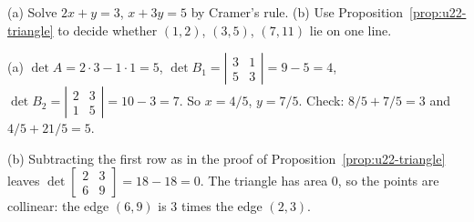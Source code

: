 \begin{exercise}\label{exr:u22-small}
(a) Solve $2x+y=3$, $x+3y=5$ by Cramer's rule.
(b) Use Proposition~\ref{prop:u22-triangle} to decide whether $(1,2)$, $(3,5)$, $(7,11)$
lie on one line.
\end{exercise}
\begin{solution}
(a) $\det A=2\cdot3-1\cdot1=5$, $\det B_1=\left|\begin{smallmatrix} 3&1\\ 5&3\end{smallmatrix}\right|=9-5=4$,
$\det B_2=\left|\begin{smallmatrix} 2&3\\ 1&5\end{smallmatrix}\right|=10-3=7$. So
$x=4/5$, $y=7/5$. Check: $8/5+7/5=3$ and $4/5+21/5=5$.

(b) Subtracting the first row as in the proof of Proposition~\ref{prop:u22-triangle} leaves
$\det\left[\begin{smallmatrix} 2&3\\ 6&9\end{smallmatrix}\right]=18-18=0$. The triangle
has area $0$, so the points are collinear: the edge $(6,9)$ is $3$ times the edge $(2,3)$.
\end{solution}
